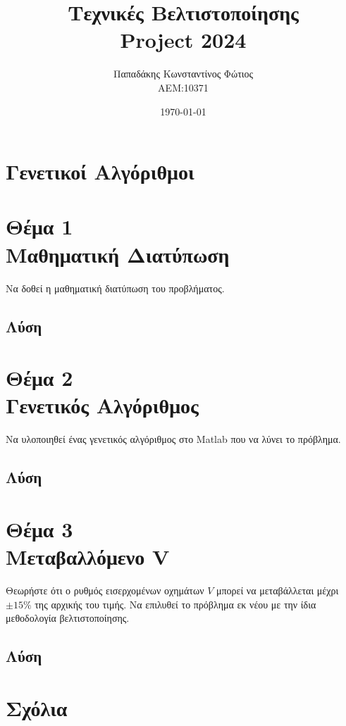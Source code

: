 \documentclass[twocolumn]{report}
\begin{document}

\title{\Huge \bfseries Τεχνικές Βελτιστοποίησης \\ Project 2024} %
\author{Παπαδάκης Κωνσταντίνος Φώτιος\vspace{0.5cm} \\  ΑΕΜ:10371} %
\date{\today}
\maketitle

\section*{Γενετικοί Αλγόριθμοι}


\section*{Θέμα 1\\Μαθηματική Διατύπωση}
Να δοθεί η μαθηματική διατύπωση του προβλήματος.
\subsection*{Λύση}


\section*{Θέμα 2\\Γενετικός Αλγόριθμος}
Να υλοποιηθεί ένας γενετικός αλγόριθμος στο 
Matlab που να λύνει το πρόβλημα.
\subsection*{Λύση}


\section*{Θέμα 3\\Μεταβαλλόμενο V}
Θεωρήστε ότι ο ρυθμός εισερχομένων οχημάτων $V$ μπορεί να μεταβάλλεται μέχρι 
$\pm 15\%$ της αρχικής του τιμής. Να επιλυθεί το πρόβλημα εκ νέου με 
την ίδια μεθοδολογία βελτιστοποίησης. 
\subsection*{Λύση}

\section*{Σχόλια}

\end{document}
